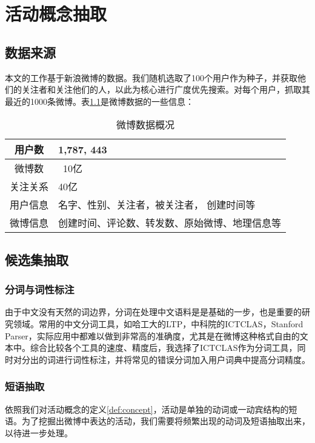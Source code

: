 
\chapter{活动概念抽取}
\section{数据来源}
本文的工作基于新浪微博的数据。我们随机选取了100个用户作为种子，并获取他们的关注者和关注他们的人，以此为核心进行广度优先搜索。对每个用户，抓取其最近的1000条微博。表\ref{table:weibo_stat}是微博数据的一些信息：
\begin{table}[!h]
\centering
\begin{tabular}{|c|p{4cm}|}
\hline
用户数 & 1,787, 443 \\
\hline
微博数 & ~10亿 \\
\hline 
关注关系 & 40亿 \\
\hline 
用户信息 & 名字、性别、关注者，被关注者， 创建时间等 \\
\hline
微博信息 & 创建时间、评论数、转发数、原始微博、地理信息等 \\
\hline
\end{tabular}
\caption{微博数据概况}
\label{table:weibo_stat}
\end{table}

\section{候选集抽取}
\subsection{分词与词性标注}

由于中文没有天然的词边界，分词在处理中文语料是是基础的一步，也是重要的研究领域。常用的中文分词工具，如哈工大的LTP，中科院的ICTCLAS，Stanford Parser，实际应用中都难以做到非常高的准确度，尤其是在微博这种格式自由的文本中。综合比较各个工具的速度、精度后，我选择了ICTCLAS作为分词工具，同时对分出的词进行词性标注，并将常见的错误分词加入用户词典中提高分词精度。

\subsection{短语抽取}
依照我们对活动概念的定义\ref{def:concept}，活动是单独的动词或一动宾结构的短语。为了挖掘出微博中表达的活动，我们需要将频繁出现的动词及短语抽取出来，以待进一步处理。


